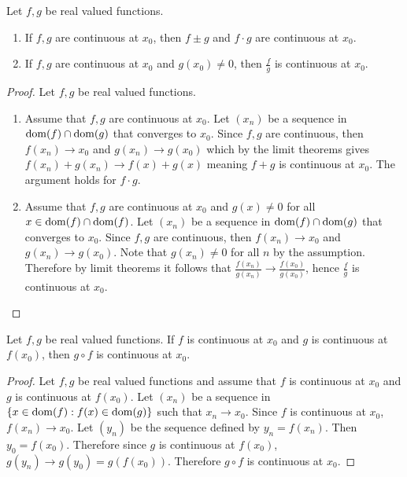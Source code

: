 \documentclass[../notes.tex]{subfiles}
\begin{document}
\begin{theorem}
    \label{thm:sumandmultiplicativecontinuity}
    Let $f,g$ be real valued functions.
    \begin{enumerate}
        \item If $f,g$ are continuous at $x_0$, then $f \pm g$ and $f\cdot g$ are continuous at $x_0$.
        \item If $f,g$ are continuous at $x_0$ and $g(x_0) \neq 0$, then $\frac{f}{g}$ is continuous at $x_0$.
    \end{enumerate}
\end{theorem}

\begin{proof}
    Let $f,g$ be real valued functions.
    \begin{enumerate}
        \item Assume that $f,g$ are continuous at $x_0$. Let $(x_n)$ be a sequence in $\operatorname{dom}(f) \cap \operatorname{dom}(g)$ that converges to $x_0$. Since $f, g$ are continuous, then $f(x_n) \to x_0$ and $g(x_n) \to g(x_0)$ which by the limit theorems gives $f(x_n) + g(x_n) \to f(x) + g(x)$ meaning $f + g$ is continuous at $x_0$. The argument holds for $f\cdot g$.
        \item Assume that $f,g$ are continuous at $x_0$ and $g(x) \neq 0$ for all $x \in \operatorname{dom}(f) \cap \operatorname{dom}(f)$. Let $(x_n)$ be a sequence in $\operatorname{dom}(f) \cap \operatorname{dom}(g)$ that converges to $x_0$. Since $f, g$ are continuous, then $f(x_n) \to x_0$ and $g(x_n) \to g(x_0)$. Note that $g(x_n) \neq 0$ for all $n$ by the assumption. Therefore by limit theorems it follows that $\frac{f(x_n)}{g(x_n)} \to \frac{f(x_0)}{g(x_0)}$, hence $\frac{f}{g}$ is continuous at $x_0$.
    \end{enumerate}
\end{proof}

\begin{theorem}
    \label{thm:compositioncontinuity}
    Let $f,g$ be real valued functions. If $f$ is continuous at $x_0$ and $g$ is continuous at $f(x_0)$, then $g \circ f$ is continuous at $x_0$.
\end{theorem}

\begin{proof}
    Let $f,g$ be real valued functions and assume that $f$ is continuous at $x_0$ and $g$ is continuous at $f(x_0)$. Let $(x_n)$ be a sequence in $\qty{x \in \operatorname{dom}(f) : f(x) \in \operatorname{dom}(g)}$ such that $x_n \to x_0$. Since $f$ is continuous at $x_0$, $f(x_n) \to x_0$. Let $(y_n)$ be the sequence defined by $y_n = f(x_n)$. Then $y_0 = f(x_0)$. Therefore since $g$ is continuous at $f(x_0)$, $g(y_n) \to g(y_0) = g(f(x_0))$. Therefore $g\circ f$ is continuous at $x_0$.
\end{proof}
\end{document}
